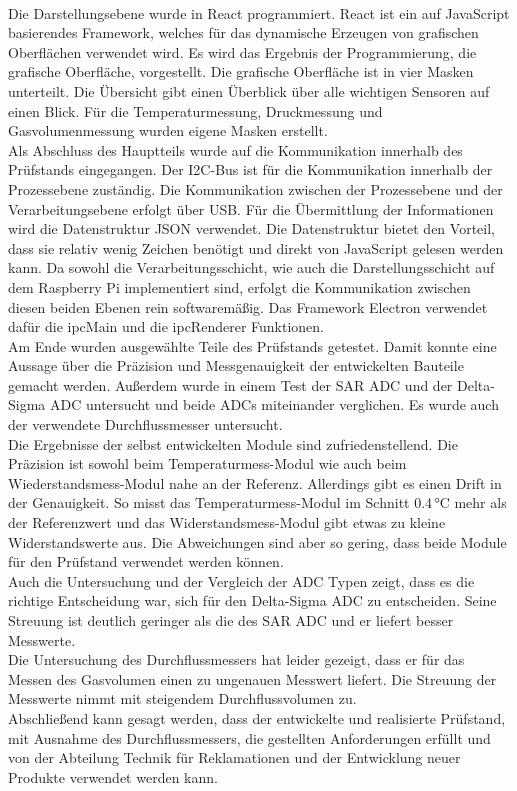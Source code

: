 \\
Die Darstellungsebene wurde in React programmiert. React ist ein auf JavaScript basierendes Framework, welches für das dynamische Erzeugen von grafischen Oberflächen verwendet wird. Es wird das Ergebnis der Programmierung, die grafische Oberfläche, vorgestellt.  Die grafische Oberfläche ist in vier Masken unterteilt. Die Übersicht gibt einen Überblick über alle wichtigen Sensoren auf einen Blick. Für die Temperaturmessung, Druckmessung und Gasvolumenmessung wurden eigene Masken erstellt.
\\
Als Abschluss des Hauptteils wurde auf die Kommunikation innerhalb des Prüfstands eingegangen. Der I2C-Bus ist für die Kommunikation innerhalb der Prozessebene zuständig. Die Kommunikation zwischen der Prozessebene und der Verarbeitungsebene erfolgt über USB. Für die Übermittlung der Informationen wird die Datenstruktur JSON verwendet. Die Datenstruktur bietet den Vorteil, dass sie relativ wenig Zeichen benötigt und direkt von JavaScript gelesen werden kann. Da sowohl die Verarbeitungsschicht, wie auch die Darstellungsschicht auf dem Raspberry Pi implementiert sind, erfolgt die Kommunikation zwischen diesen beiden Ebenen rein softwaremäßig. Das Framework Electron verwendet dafür die ipcMain und die ipcRenderer Funktionen.
\\
Am Ende wurden ausgewählte Teile des Prüfstands getestet. Damit konnte eine Aussage über die Präzision und Messgenauigkeit der entwickelten Bauteile gemacht werden. Außerdem wurde in einem Test der SAR ADC und der Delta-Sigma ADC untersucht und beide ADCs miteinander verglichen. Es wurde auch der verwendete Durchflussmesser untersucht.
\\
Die Ergebnisse der selbst entwickelten Module sind zufriedenstellend. Die Präzision ist sowohl beim Temperaturmess-Modul wie auch beim Wiederstandsmess-Modul nahe an der Referenz. Allerdings gibt es einen Drift in der Genauigkeit. So misst das Temperaturmess-Modul im Schnitt 0.4\,°C mehr als der Referenzwert und das Widerstandsmess-Modul gibt etwas zu kleine Widerstandswerte aus. Die Abweichungen sind aber so gering, dass beide Module für den Prüfstand verwendet werden können.
\\
Auch die Untersuchung und der Vergleich der ADC Typen zeigt, dass es die richtige Entscheidung war, sich für den Delta-Sigma ADC zu entscheiden. Seine Streuung ist deutlich geringer als die des SAR ADC und er liefert besser Messwerte.
\\
Die Untersuchung des Durchflussmessers hat leider gezeigt, dass er für das Messen des Gasvolumen einen zu ungenauen Messwert liefert. Die Streuung der Messwerte nimmt mit steigendem Durchflussvolumen zu.
\\
Abschließend kann gesagt werden, dass der entwickelte und realisierte Prüfstand, mit Ausnahme des Durchflussmessers, die gestellten Anforderungen erfüllt und von der Abteilung Technik für Reklamationen und der Entwicklung neuer Produkte verwendet werden kann.

